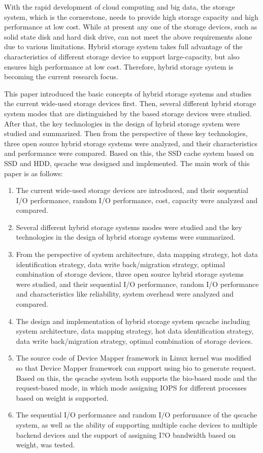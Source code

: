 \begin{englishabstract}

With the rapid development of cloud computing and big data, the storage system, which is the cornerstone, needs to provide high storage capacity and high performance at low cost. While at present any one of the storage devices, such as solid state disk and hard disk drive, can not meet the above requirements alone due to various limitations. Hybrid storage system takes full advantage of the characteristics of different storage device to support large-capacity, but also ensures high performance at low cost. Therefore, hybrid storage system is becoming the current research focus. 

This paper introduced the basic concepts of hybrid storage systems and studies the current wide-used storage devices first. Then, several different hybrid storage system modes that are distinguished by the based storage devices were studied. After that, the key technologies in the design of hybrid storage system were studied and summarized. Then from the perspective of these key technologies, three open source hybrid storage systems were analyzed, and their characteristics and performance were compared. Based on this, the SSD cache system based on SSD and HDD, qscache was designed and implemented. The main work of this paper is as follows:


\begin{enumerate}[wide]
    \item The current wide-used storage devices are introduced, and their sequential I/O performance, random I/O performance, cost, capacity were analyzed and compared.
    \item Several different hybrid storage systems modes were studied and the key technologies in the design of hybrid storage systems were summarized.
    \item From the perspective of system architecture, data mapping strategy, hot data identification strategy, data write back/migration strategy, optimal combination of storage devices, three open source hybrid storage systems were studied, and their sequential I/O performance, random I/O performance and characteristics like reliability, system overhead were analyzed and compared.
    \item The design and implementation of hybrid storage system qscache including system architecture, data mapping strategy, hot data identification strategy, data write back/migration strategy, optimal combination of storage devices.
    \item The source code of Device Mapper framework in Linux kernel was modified so that Device Mapper framework can support using bio to generate request. Based on this, the qscache system both supports the bio-based mode and the request-based mode, in which mode assigning IOPS for different processes based on weight is supported.
    \item The sequential I/O performance and random I/O performance of the qscache system, as well as the ability of supporting multiple cache devices to multiple backend devices and the support of assigning I?O bandwidth based on weight, was tested.
\end{enumerate}


\end{englishabstract}
